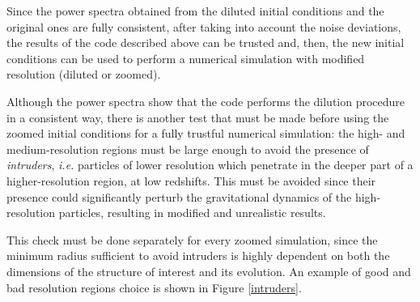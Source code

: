\documentclass[11pt,a4paper,titlepage]{article}
\newcommand{\ie}{\emph{i.e.}\xspace}
\begin{document}
Since the power spectra obtained from the diluted initial conditions and the original ones are fully consistent, after taking into account the noise deviations, the results of the code described above can be trusted and, then, the new initial conditions can be used to perform a numerical simulation with modified resolution (diluted or zoomed).

Although the power spectra show that the code performs the dilution procedure in a consistent way, there is another test that must be made before using the zoomed initial conditions for a fully trustful numerical simulation: the high- and medium-resolution regions must be large enough to avoid the presence of \emph{intruders}, \ie particles of lower resolution which penetrate in the deeper part of a higher-resolution region, at low redshifts. This must be avoided since their presence could significantly perturb the gravitational dynamics of the high-resolution particles, resulting in modified and unrealistic results.

This check must be done separately for every zoomed simulation, since the minimum radius sufficient to avoid intruders is highly dependent on both the dimensions of the structure of interest and its evolution. An example of good and bad resolution regions choice is shown in Figure \ref{intruders}.
\end{document}
